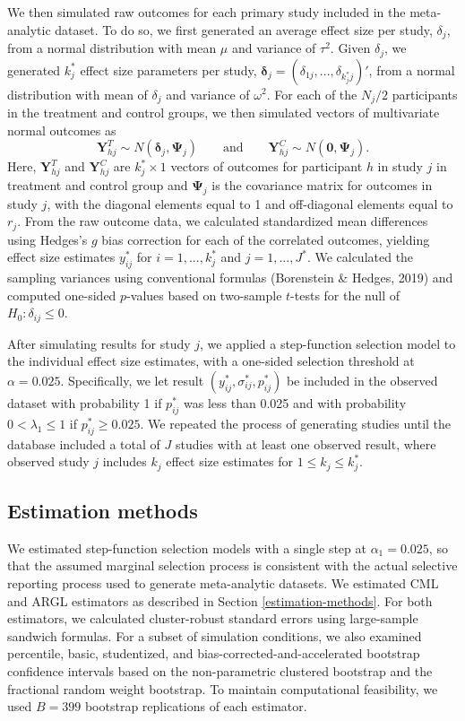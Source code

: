 \documentclass[
  man, donotrepeattitle,floatsintext]{apa7}
\begin{document}
We then simulated raw outcomes for each primary study included in the
meta-analytic dataset. To do so, we first generated an average effect
size per study, \(\delta_j\), from a normal distribution with mean \(\mu\) and variance
of \(\tau^2\). Given \(\delta_j\), we generated \(k_j^*\) effect size parameters per study, \(\boldsymbol\delta_j = \left(\delta_{1j},...,\delta_{k_j^* j}\right)'\), from a normal distribution with mean of \(\delta_j\) and
variance of \(\omega^2\).
For each of the \(N_j / 2\) participants in the treatment and control groups, we then simulated vectors of multivariate normal outcomes as
\[
\mathbf{Y}_{hj}^T \sim N(\boldsymbol\delta_j, \boldsymbol\Psi_j) \qquad \text{and} \qquad
\mathbf{Y}_{hj}^C \sim N(\mathbf{0}, \boldsymbol\Psi_j).
\]
Here, \(\mathbf{Y}_{hj}^T\) and \(\mathbf{Y}_{hj}^C\) are
\(k_j^* \times 1\) vectors of outcomes for participant \(h\) in study \(j\) in
treatment and control group and \(\boldsymbol\Psi_j\) is the covariance matrix for outcomes in study \(j\), with the diagonal elements equal to 1 and off-diagonal elements equal to \(r_j\).
From the raw outcome data, we calculated standardized mean
differences using Hedges's \(g\) bias correction for each of the correlated outcomes, yielding effect size estimates \(y^*_{ij}\) for \(i=1,...,k_j^*\) and \(j = 1,...,J^*\).
We calculated the sampling variances using conventional formulas (Borenstein \& Hedges, 2019) and computed one-sided \(p\)-values based on two-sample \(t\)-tests for the null of \(H_0: \delta_{ij} \leq 0\).

After simulating results for study \(j\), we applied a step-function selection
model to the individual effect size estimates, with a one-sided selection
threshold at \(\alpha = 0.025\). Specifically, we let result \((y^*_{ij},
\sigma_{ij}^*, p_{ij}^*)\) be included in the observed dataset with probability
1 if \(p_{ij}^*\) was less than 0.025 and with probability \(0 < \lambda_1 \leq 1\) if \(p_{ij}^* \ge 0.025\).
We repeated the process of generating studies until the database included a total of \(J\) studies with at least one observed result, where observed study \(j\) includes \(k_j\) effect size estimates for \(1 \leq k_j \leq k_j^*\).

\subsection{Estimation methods}\label{estimation-methods-1}

We estimated step-function selection models with a single step at \(\alpha_1 = 0.025\), so that the assumed marginal selection process is consistent with the actual selective reporting process used to generate meta-analytic datasets.
We estimated CML and ARGL estimators as described in Section \ref{estimation-methods}.
For both estimators, we calculated cluster-robust standard errors using large-sample sandwich formulas.
For a subset of simulation conditions, we also examined percentile, basic, studentized, and bias-corrected-and-accelerated bootstrap confidence intervals based on the non-parametric clustered bootstrap and the fractional random weight bootstrap.
To maintain computational feasibility, we used \(B = 399\) bootstrap replications of each estimator.
\end{document}
